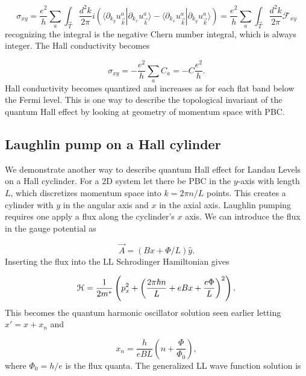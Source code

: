 \begin{equation}
  \sigma_{xy} = \dfrac{e^2}{h} \sum_{a} \int_{\vec{T}} \dfrac{d^2k}{2\pi} i\left(\langle \partial_{k_y} u_{\vec{k}}^a | \partial_{k_x} u_{\vec{k}}^a \rangle - \langle \partial_{k_x} u_{\vec{k}}^a | \partial_{k_y} u_{\vec{k}}^a \rangle \right) = \dfrac{e^2}{h} \sum_{a} \int_{\vec{T}} \dfrac{d^2k}{2\pi} \mathcal{F}_{xy}
\end{equation}
recognizing the integral is the negative Chern number integral, which is always integer.
The Hall conductivity becomes

\begin{equation}
  \sigma_{xy} = -\dfrac{e^2}{h} \sum_a C_a = -C \dfrac{e^2}{h}.
\end{equation}
Hall conductivity becomes quantized and increases as for each flat band below the Fermi level.
This is one way to describe the topological invariant of the quantum Hall effect by looking at geometry of momentum space with PBC.

\subsection{Laughlin pump on a Hall cylinder}
We demonstrate another way to describe quantum Hall effect for Landau Levels on a Hall cyclinder.
For a 2D system let there be PBC in the $y$-axis with length $L$, which discretizes momentum space into $k = 2\pi n/ L$ points.
This creates a cylinder with $y$ in the angular axis and $x$ in the axial axis.
Laughlin pumping requires one apply a flux along the cyclinder's $x$ axis.
We can introduce the flux in the gauge potential as

\begin{equation}
  \vec{A} = (Bx + \Phi/L)\hat{y}.
\end{equation}
Inserting the flux into the LL Schrodinger Hamiltonian gives

\begin{equation}
  \mathcal{H} = \dfrac{1}{2m^*} \left( p_x^2 + {\left(\dfrac{2\pi \hbar n}{L} + eBx + \dfrac{e\Phi}{L} \right)}^2\right).
\end{equation}
This becomes the quantum harmonic oscillator solution seen earlier letting $x' = x + x_n$ and

\begin{equation} \label{eq:xCM}
  x_n = \dfrac{h}{eBL} \left(n + \dfrac{\Phi}{\Phi_0} \right),
\end{equation}
where $\Phi_0 = h/e$ is the flux quanta.
The generalized LL wave function solution is

